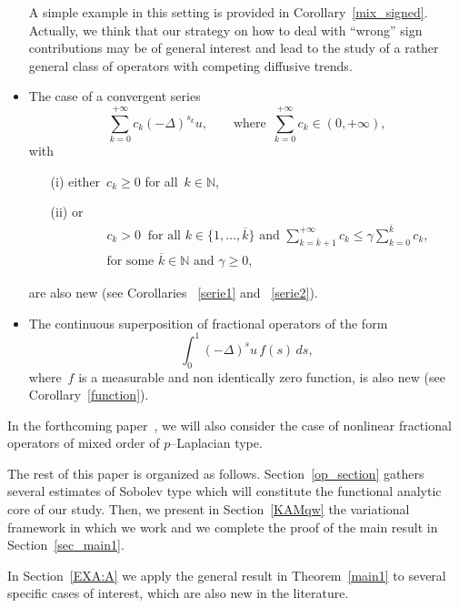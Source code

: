 \documentclass[12pt,a4paper,intlimits,sumlimits]{amsart}
\def \N {\mathbb{N}}
\theoremstyle{definition}
\theoremstyle{plain}
\numberwithin{equation}{section}
\renewcommand{\le}{\leqslant}
\renewcommand{\ge}{\geqslant}
\begin{document}
\begin{itemize}
A simple example in this setting is provided in Corollary~\ref{mix_signed}.
Actually, we think that our strategy on how to deal with ``wrong'' sign contributions
may be of general interest and lead to the study of a rather general class of operators with competing diffusive trends.
\medskip

\item The case of a convergent series
$$ \sum_{k=0}^{+\infty} c_k (-\Delta)^{s_k} u,\qquad{\mbox{where }}\,
\sum_{k=0}^{+\infty} c_k\in(0,+\infty),$$
with 
\begin{itemize}
\item[(i)] either~$c_k\ge0$ for all~$k\in\N$,
\item[(ii)] or
\begin{eqnarray*}& &
c_k>0\ \text{ for all } k\in\{1,\dots, \overline k\} \text{ and } \sum_{k=\overline k +1}^{+\infty} c_k \le \gamma \sum_{k=0}^{\overline k} c_k,\\
&&{\mbox{for some~$\overline k\in\N$ and~$\gamma\ge0$,}}\end{eqnarray*}
\end{itemize}
are also new (see Corollaries ~\ref{serie1} and ~\ref{serie2}).\medskip

\item The continuous superposition of fractional operators of the form
$$ \int_0^1 (-\Delta)^s u \,f(s)\,ds,$$
where~$f$ is a measurable
and non identically zero function,
is also new (see Corollary~\ref{function}).
\end{itemize}

In the forthcoming paper~\cite{CATERINA-PP}, we will also consider the case of nonlinear fractional operators of mixed order of $p$--Laplacian type.
\medskip

The rest of this paper is organized as follows. Section~\ref{op_section} gathers several estimates
of Sobolev type which will constitute the functional analytic core of our study.
Then, we present in Section~\ref{KAMqw} the variational framework in which we work and we complete the proof of the main result in Section~\ref{sec_main1}.

In Section~\ref{EXA:A} we apply the general result
in Theorem~\ref{main1} to several specific cases of interest, which are also new in the literature.
\end{document}
